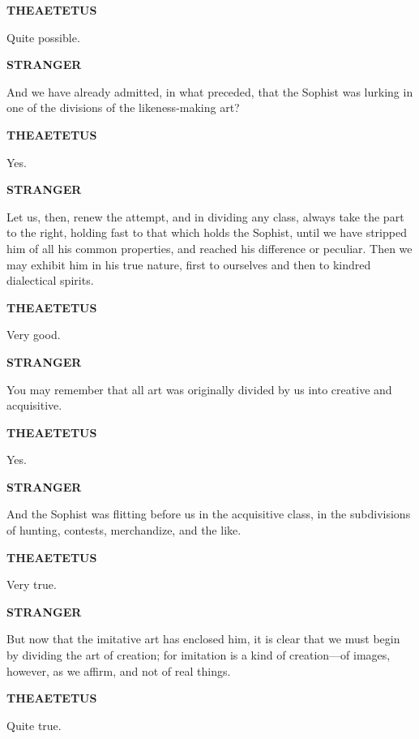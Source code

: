 \documentclass[11pt,letter]{article}
\begin{document}
\par \textbf{THEAETETUS}
\par   Quite possible.

\par \textbf{STRANGER}
\par   And we have already admitted, in what preceded, that the Sophist was lurking in one of the divisions of the likeness-making art?

\par \textbf{THEAETETUS}
\par   Yes.

\par \textbf{STRANGER}
\par   Let us, then, renew the attempt, and in dividing any class, always take the part to the right, holding fast to that which holds the Sophist, until we have stripped him of all his common properties, and reached his difference or peculiar. Then we may exhibit him in his true nature, first to ourselves and then to kindred dialectical spirits.

\par \textbf{THEAETETUS}
\par   Very good.

\par \textbf{STRANGER}
\par   You may remember that all art was originally divided by us into creative and acquisitive.

\par \textbf{THEAETETUS}
\par   Yes.

\par \textbf{STRANGER}
\par   And the Sophist was flitting before us in the acquisitive class, in the subdivisions of hunting, contests, merchandize, and the like.

\par \textbf{THEAETETUS}
\par   Very true.

\par \textbf{STRANGER}
\par   But now that the imitative art has enclosed him, it is clear that we must begin by dividing the art of creation; for imitation is a kind of creation—of images, however, as we affirm, and not of real things.

\par \textbf{THEAETETUS}
\par   Quite true.
\end{document}

